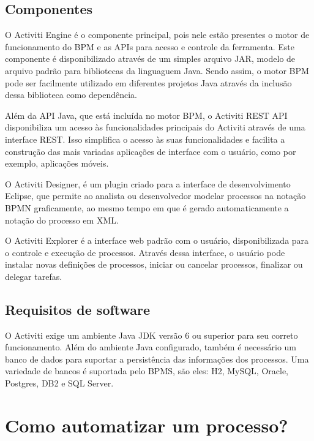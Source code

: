 \subsection{Componentes}\label{sec:activiti-gestao_processos_componentes}

O Activiti Engine é o componente principal, pois nele estão presentes o motor de funcionamento do BPM e as APIs para acesso e controle da ferramenta. Este componente é disponibilizado através de um simples arquivo JAR, modelo de arquivo padrão para bibliotecas da linguaguem Java. Sendo assim, o motor BPM pode ser facilmente utilizado em diferentes projetos Java através da inclusão dessa biblioteca como dependência.

Além da API Java, que está incluída no motor BPM, o Activiti REST API disponibiliza um acesso às funcionalidades principais do Activiti através de uma interface REST. Isso simplifica o acesso às suas funcionalidades e facilita a construção das mais variadas aplicações de interface com o usuário, como por exemplo, aplicações móveis.

O Activiti Designer, é um plugin criado para a interface de desenvolvimento Eclipse, que permite ao analista ou desenvolvedor modelar processos na notação BPMN graficamente, ao mesmo tempo em que é gerado automaticamente a notação do processo em XML.

O Activiti Explorer é a interface web padrão com o usuário, disponibilizada para o controle e execução de processos. Através dessa interface, o usuário pode instalar novas definições de processos, iniciar ou cancelar processos, finalizar ou delegar tarefas.

\subsection{Requisitos de software}\label{sec:activiti-gestao_processos_requisitos}

O Activiti exige um ambiente Java JDK versão 6 ou superior para seu correto funcionamento. Além do ambiente Java configurado, também é necessário um banco de dados para suportar a persistência das informações dos processos. Uma variedade de bancos é suportada pelo BPMS, são eles: H2, MySQL, Oracle, Postgres, DB2 e SQL Server.


\section{Como automatizar um processo?}\label{sec:activiti-automatizar_processo}

